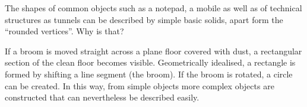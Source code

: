 



%

\begin{MIntro}

The shapes of common objects such as a notepad, a mobile as well as of
technical structures as tunnels can be described by simple basic solids,
apart form the ``rounded vertices''. Why is that?

If a broom is moved straight across a plane floor covered with dust, 
a rectangular section of the clean floor becomes visible. Geometrically idealised, 
a rectangle is formed by shifting a line segment (the broom). If the 
broom is rotated, a circle can be created. In this way, from simple 
objects more complex objects are constructed that can nevertheless be described easily.

\end{MIntro}

